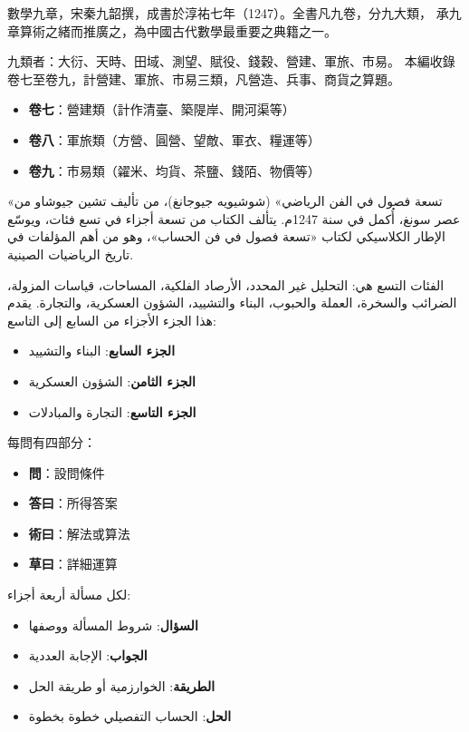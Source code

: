 \documentclass[11pt,a4paper]{article}
\begin{document}
\noindent
\begin{minipage}[t]{0.48\textwidth}
數學九章，宋秦九韶撰，成書於淳祐七年（1247）。全書凡九卷，分九大類，
承九章算術之緒而推廣之，為中國古代數學最重要之典籍之一。

九類者：大衍、天時、田域、測望、賦役、錢穀、營建、軍旅、市易。
本編收錄卷七至卷九，計營建、軍旅、市易三類，凡營造、兵事、商貨之算題。
\begin{itemize}[leftmargin=1.5em]
  \item \textbf{卷七}：營建類（計作清臺、築隄岸、開河渠等）
  \item \textbf{卷八}：軍旅類（方營、圓營、望敵、軍衣、糧運等）
  \item \textbf{卷九}：市易類（糴米、均貨、茶鹽、錢陌、物價等）
\end{itemize}
\end{minipage}
\hfill
\begin{minipage}[t]{0.48\textwidth}
\arabicfont\beginR
«تسعة فصول في الفن الرياضي» (شوشيويه جيوجانغ)، من تأليف
تشين جيوشاو من عصر سونغ، أُكمل في سنة 1247م. يتألف الكتاب من تسعة
أجزاء في تسع فئات، ويوسّع الإطار الكلاسيكي لكتاب «تسعة فصول في
فن الحساب»، وهو من أهم المؤلفات في تاريخ الرياضيات الصينية.

الفئات التسع هي: التحليل غير المحدد، الأرصاد الفلكية، المساحات،
قياسات المزولة، الضرائب والسخرة، العملة والحبوب، البناء والتشييد،
الشؤون العسكرية، والتجارة. يقدم هذا الجزء الأجزاء من السابع إلى التاسع:
\begin{itemize}[leftmargin=1.5em]
  \item \textbf{الجزء السابع}: البناء والتشييد
  \item \textbf{الجزء الثامن}: الشؤون العسكرية
  \item \textbf{الجزء التاسع}: التجارة والمبادلات
\end{itemize}
\endR
\end{minipage}

\vspace{0.5cm}

\noindent
\begin{minipage}[t]{0.48\textwidth}
每問有四部分：
\begin{itemize}[leftmargin=1.5em]
  \item \textbf{問}：設問條件
  \item \textbf{答曰}：所得答案
  \item \textbf{術曰}：解法或算法
  \item \textbf{草曰}：詳細運算
\end{itemize}
\end{minipage}
\hfill
\begin{minipage}[t]{0.48\textwidth}
\arabicfont\beginR
لكل مسألة أربعة أجزاء:
\begin{itemize}[leftmargin=1.5em]
  \item \textbf{السؤال}: شروط المسألة ووصفها
  \item \textbf{الجواب}: الإجابة العددية
  \item \textbf{الطريقة}: الخوارزمية أو طريقة الحل
  \item \textbf{الحل}: الحساب التفصيلي خطوة بخطوة
\end{itemize}
\endR
\end{minipage}
\end{document}
